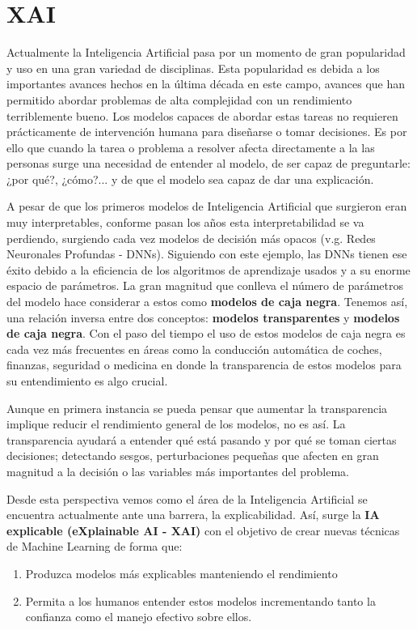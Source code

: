 \documentclass[oneside,openright,titlepage,numbers=noenddot,openany,headinclude,footinclude=true,
cleardoublepage=empty,abstractoff,BCOR=5mm,paper=a4,fontsize=12pt,main=spanish]{scrreprt}
\begin{document}
\section{XAI}
Actualmente la Inteligencia Artificial pasa por un momento de gran popularidad y
uso en una gran variedad de disciplinas. Esta popularidad es debida a los
importantes avances hechos en la última década en este campo, avances que han
permitido abordar problemas de alta complejidad con un rendimiento terriblemente
bueno. Los modelos capaces de abordar estas tareas no requieren prácticamente de
intervención humana para diseñarse o tomar decisiones. Es por ello que cuando la
tarea o problema a resolver afecta directamente a la las personas surge una
necesidad de entender al modelo, de ser capaz de preguntarle: ¿por qué?, ¿cómo?...
y de que el modelo sea capaz de dar una explicación.

A pesar de que los primeros modelos de Inteligencia Artificial que surgieron eran
muy interpretables, conforme pasan los años esta interpretabilidad se va
perdiendo, surgiendo cada vez modelos de decisión más opacos (v.g. Redes
Neuronales Profundas - DNNs). Siguiendo con este ejemplo, las
DNNs tienen ese éxito debido a la eficiencia de los algoritmos de
aprendizaje usados y a su enorme espacio de parámetros. La gran magnitud que
conlleva el número de parámetros del modelo hace considerar a estos como
\textbf{modelos de caja negra}. Tenemos así, una relación inversa entre dos
conceptos: \textbf{modelos transparentes} y \textbf{modelos de caja negra}.
Con el paso del tiempo el uso de estos modelos de caja negra es cada vez más
frecuentes en áreas como la conducción automática de coches, finanzas, seguridad o
medicina en donde la transparencia de estos modelos para su entendimiento es algo
crucial.

Aunque en primera instancia se pueda pensar que aumentar la transparencia implique
reducir el rendimiento general de los modelos, no es así. La transparencia ayudará
a entender qué está pasando y por qué se toman ciertas decisiones; detectando
sesgos, perturbaciones pequeñas que afecten en gran magnitud a la decisión o las variables más importantes del problema. 

Desde esta perspectiva vemos como el área de la Inteligencia Artificial se
encuentra actualmente ante una barrera, la explicabilidad. Así, surge la
\textbf{IA explicable (eXplainable AI - XAI)} con el objetivo de crear nuevas
técnicas de Machine Learning de forma que:

\begin{enumerate}
    \item Produzca modelos más explicables manteniendo el rendimiento
    \item Permita a los humanos entender estos modelos incrementando tanto la confianza como el manejo efectivo sobre ellos.
\end{enumerate}
\end{document}
